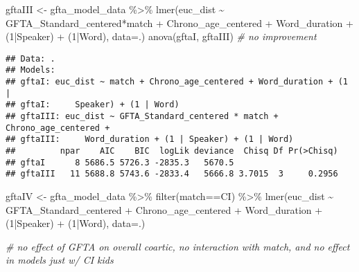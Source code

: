 \documentclass[
]{article}
\newenvironment{Shaded}{\begin{snugshade}}{\end{snugshade}}
\newcommand{\AttributeTok}[1]{\textcolor[rgb]{0.77,0.63,0.00}{#1}}
\newcommand{\CommentTok}[1]{\textcolor[rgb]{0.56,0.35,0.01}{\textit{#1}}}
\newcommand{\DecValTok}[1]{\textcolor[rgb]{0.00,0.00,0.81}{#1}}
\newcommand{\FunctionTok}[1]{\textcolor[rgb]{0.00,0.00,0.00}{#1}}
\newcommand{\NormalTok}[1]{#1}
\newcommand{\OtherTok}[1]{\textcolor[rgb]{0.56,0.35,0.01}{#1}}
\newcommand{\SpecialCharTok}[1]{\textcolor[rgb]{0.00,0.00,0.00}{#1}}
\newcommand{\StringTok}[1]{\textcolor[rgb]{0.31,0.60,0.02}{#1}}
\begin{document}
\begin{Shaded}
\begin{Highlighting}[]
\NormalTok{gftaIII }\OtherTok{\textless{}{-}}\NormalTok{ gfta\_model\_data }\SpecialCharTok{\%\textgreater{}\%}
  \FunctionTok{lmer}\NormalTok{(euc\_dist }\SpecialCharTok{\textasciitilde{}}\NormalTok{ GFTA\_Standard\_centered}\SpecialCharTok{*}\NormalTok{match }\SpecialCharTok{+} 
\NormalTok{         Chrono\_age\_centered }\SpecialCharTok{+} 
\NormalTok{         Word\_duration }\SpecialCharTok{+} 
\NormalTok{         (}\DecValTok{1}\SpecialCharTok{|}\NormalTok{Speaker) }\SpecialCharTok{+} 
\NormalTok{         (}\DecValTok{1}\SpecialCharTok{|}\NormalTok{Word), }
       \AttributeTok{data=}\NormalTok{.) }
\FunctionTok{anova}\NormalTok{(gftaI, gftaIII) }\CommentTok{\# no improvement}
\end{Highlighting}
\end{Shaded}

\begin{verbatim}
## Data: .
## Models:
## gftaI: euc_dist ~ match + Chrono_age_centered + Word_duration + (1 | 
## gftaI:     Speaker) + (1 | Word)
## gftaIII: euc_dist ~ GFTA_Standard_centered * match + Chrono_age_centered + 
## gftaIII:     Word_duration + (1 | Speaker) + (1 | Word)
##         npar    AIC    BIC  logLik deviance  Chisq Df Pr(>Chisq)
## gftaI      8 5686.5 5726.3 -2835.3   5670.5                     
## gftaIII   11 5688.8 5743.6 -2833.4   5666.8 3.7015  3     0.2956
\end{verbatim}

\begin{Shaded}
\begin{Highlighting}[]
\NormalTok{gftaIV }\OtherTok{\textless{}{-}}\NormalTok{ gfta\_model\_data }\SpecialCharTok{\%\textgreater{}\%}
  \FunctionTok{filter}\NormalTok{(match}\SpecialCharTok{==}\StringTok{\textquotesingle{}CI\textquotesingle{}}\NormalTok{) }\SpecialCharTok{\%\textgreater{}\%}
  \FunctionTok{lmer}\NormalTok{(euc\_dist }\SpecialCharTok{\textasciitilde{}}\NormalTok{ GFTA\_Standard\_centered }\SpecialCharTok{+} 
\NormalTok{         Chrono\_age\_centered }\SpecialCharTok{+} 
\NormalTok{         Word\_duration }\SpecialCharTok{+} 
\NormalTok{         (}\DecValTok{1}\SpecialCharTok{|}\NormalTok{Speaker) }\SpecialCharTok{+} 
\NormalTok{         (}\DecValTok{1}\SpecialCharTok{|}\NormalTok{Word), }
       \AttributeTok{data=}\NormalTok{.) }

\CommentTok{\# no effect of GFTA on overall coartic, no interaction with match, and no effect in models just w/ CI kids}
\end{Highlighting}
\end{Shaded}
\end{document}
